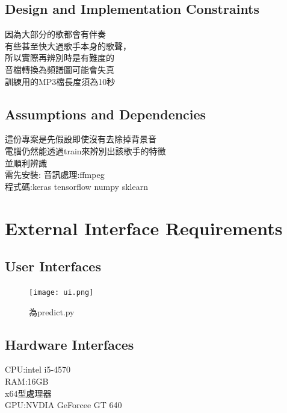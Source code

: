 \documentclass{article}
\begin{document}
\begin{CJK}{UTF8}{bkai}
\subsection{\Large Design and Implementation Constraints\\}
   \Large 因為大部分的歌都會有伴奏 \\
有些甚至快大過歌手本身的歌聲，\\
所以實際再辨別時是有難度的\\
音檔轉換為頻譜圖可能會失真\\
訓練用的MP3檔長度須為10秒
\subsection{\Large  Assumptions and Dependencies\\}
  \Large  這份專案是先假設即使沒有去除掉背景音\\
 電腦仍然能透過train來辨別出該歌手的特徵\\
並順利辨識\\
需先安裝:
音訊處理:ffmpeg\\
程式碼:keras tensorflow numpy sklearn
\newpage

\section{\huge\bf  \color{blue} External Interface Requirements\\}
\subsection{\Large User Interfaces\\}
\begin{figure}[h]
\begin{center}
\texttt{[image: ui.png]}
\end{center}
\caption{為predict.py}
\label{fig:1}
\end{figure}
\subsection{\Large Hardware Interfaces\\}
CPU:intel i5-4570\\
RAM:16GB\\
x64型處理器\\
GPU:NVDIA GeForcee GT 640\\

\newpage

\end{CJK}
\end{document}
